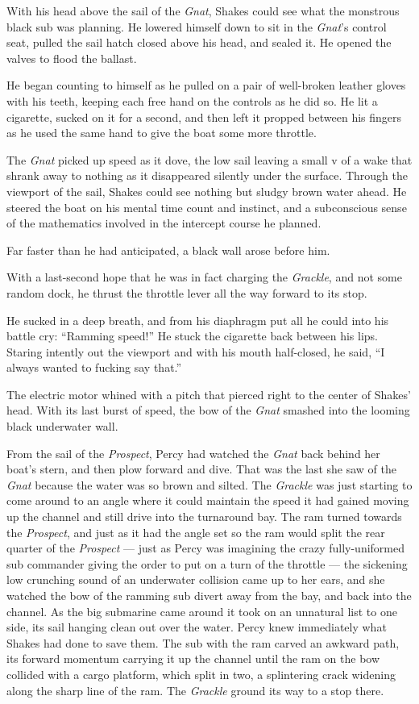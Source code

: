 \documentclass[
]{scrbook}
\begin{document}
With his head above the sail of the \emph{Gnat}, Shakes could see what
the monstrous black sub was planning. He lowered himself down to sit in
the \emph{Gnat}'s control seat, pulled the sail hatch closed above his
head, and sealed it. He opened the valves to flood the ballast.

He began counting to himself as he pulled on a pair of well-broken
leather gloves with his teeth, keeping each free hand on the controls as
he did so. He lit a cigarette, sucked on it for a second, and then left
it propped between his fingers as he used the same hand to give the boat
some more throttle.

The \emph{Gnat} picked up speed as it dove, the low sail leaving a small
v of a wake that shrank away to nothing as it disappeared silently under
the surface. Through the viewport of the sail, Shakes could see nothing
but sludgy brown water ahead. He steered the boat on his mental time
count and instinct, and a subconscious sense of the mathematics involved
in the intercept course he planned.

Far faster than he had anticipated, a black wall arose before him.

With a last-second hope that he was in fact charging the \emph{Grackle},
and not some random dock, he thrust the throttle lever all the way
forward to its stop.

He sucked in a deep breath, and from his diaphragm put all he could into
his battle cry: ``Ramming speed!'' He stuck the cigarette back between
his lips. Staring intently out the viewport and with his mouth
half-closed, he said, ``I always wanted to fucking say that.''

The electric motor whined with a pitch that pierced right to the center
of Shakes' head. With its last burst of speed, the bow of the
\emph{Gnat} smashed into the looming black underwater wall.

\bigskip

From the sail of the \emph{Prospect}, Percy had watched the \emph{Gnat}
back behind her boat's stern, and then plow forward and dive. That was
the last she saw of the \emph{Gnat} because the water was so brown and
silted. The \emph{Grackle} was just starting to come around to an angle
where it could maintain the speed it had gained moving up the channel
and still drive into the turnaround bay. The ram turned towards the
\emph{Prospect}, and just as it had the angle set so the ram would split
the rear quarter of the \emph{Prospect} --- just as Percy was imagining
the crazy fully-uniformed sub commander giving the order to put on a
turn of the throttle --- the sickening low crunching sound of an
underwater collision came up to her ears, and she watched the bow of the
ramming sub divert away from the bay, and back into the channel. As the
big submarine came around it took on an unnatural list to one side, its
sail hanging clean out over the water. Percy knew immediately what
Shakes had done to save them. The sub with the ram carved an awkward
path, its forward momentum carrying it up the channel until the ram on
the bow collided with a cargo platform, which split in two, a
splintering crack widening along the sharp line of the ram. The
\emph{Grackle} ground its way to a stop there.
\end{document}
